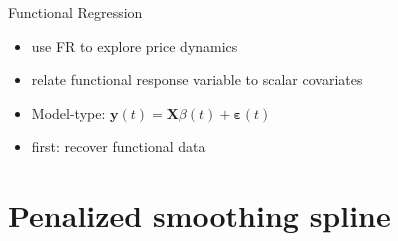 \documentclass[hyperref={pdfpagelabels=false}]{beamer}
\begin{document}
\begin{frame}{Functional Regression}
\begin{itemize}
    \item use FR to explore price dynamics
    \item relate functional response variable to scalar covariates
    \item Model-type: $\mathbf{y}(t)=\mathbf{X}\beta(t)+\mathbf{\varepsilon}(t)$
    \item first: recover functional data
\end{itemize}
\end{frame}

\section{Penalized smoothing spline}
    


\end{document}
